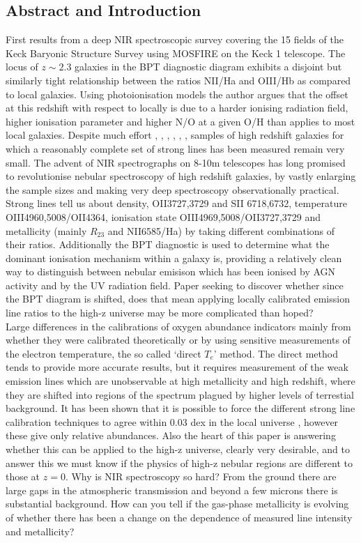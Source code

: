 \documentclass{literature}
\begin{document}
\subsection{Abstract and Introduction}
First results from a deep NIR spectroscopic survey covering the 15 fields of the Keck Baryonic Structure Survey using MOSFIRE on the Keck 1 telescope. The locus of $z\sim 2.3$ galaxies in the BPT diagnostic diagram exhibits a disjoint but similarly tight relationship between the ratios NII/Ha and OIII/Hb as compared to local galaxies. Using photoionisation models the author argues that the offset at this redshift with respect to locally is due to a harder ionising radiation field, higher ionisation parameter and higher N/O at a given O/H than applies to most local galaxies. Despite much effort \citep{Mannucci2010}, \citep{ForsterSchreiber2009}, \citep{Cullen2014}, \citep{Troncoso_2014}, \citep{Wuyts_2014}, \citep{Henry2013}, \citep{Maiolino2008} samples of high redshift galaxies for which a reasonably complete set of strong lines has been measured remain very small. The advent of NIR spectrographs on 8-10m telescopes has long promised to revolutionise nebular spectroscopy of high redshift galaxies, by vastly enlarging the sample sizes and making very deep spectroscopy observationally practical. Strong lines tell us about density, OII3727,3729 and SII 6718,6732,  temperature OIII4960,5008/OII4364, ionisation state OIII4969,5008/OII3727,3729 and metallicity (mainly $R_{23}$ and NII6585/Ha) by taking different combinations of their ratios. Additionally the BPT diagnostic is used to determine what the dominant ionisation mechanism within a galaxy is, providing a relatively clean way to distinguish between nebular emisison which has been ionised by AGN activity and by the UV radiation field. Paper seeking to discover whether since the BPT diagram is shifted, does that mean applying locally calibrated emission line ratios to the high-z universe may be more complicated than hoped? \\ 
Large differences in the calibrations of oxygen abundance indicators mainly from whether they were calibrated theoretically or by using sensitive measurements of the electron temperature, the so called `direct $T_{e}$' method. The direct method tends to provide more accurate results, but it requires measurement of the weak emission lines which are unobservable at high metallicity and high redshift, where they are shifted into regions of the spectrum plagued by higher levels of terrestial background. It has been shown that it is possible to force the different strong line calibration techniques to agree within 0.03 dex in the local universe \citep{Kewley_2008}, however these give only relative abundances. Also the heart of this paper is answering whether this can be applied to the high-z universe, clearly very desirable, and to answer this we must know if the physics of high-z nebular regions are different to those at $z=0$. Why is NIR spectroscopy so hard? From the ground there are large gaps in the atmospheric transmission and beyond a few microns there is substantial background. How can you tell if the gas-phase metallicity is evolving of whether there has been a change on the dependence of measured line intensity and metallicity? \\ 
\end{document}

